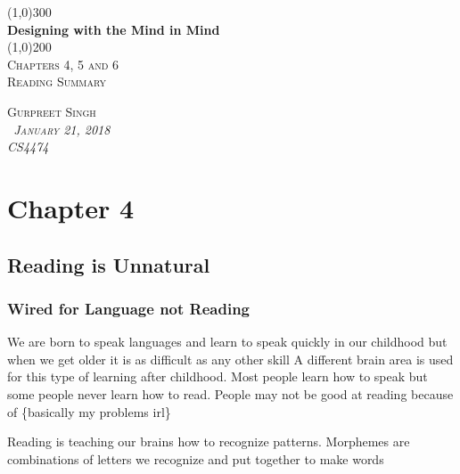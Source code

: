 \documentclass[11pt,]{article}
\begin{document}
\begin{titlepage}
    \begin{center}
    \line(1,0){300} \\ 
    [0.25in]
    \huge{\bfseries Designing with the Mind in Mind} \\
    [2mm]
    \line(1,0){200} \\
    [1.5cm] 
    \textsc{\Large Chapters 4, 5 and 6} \\
    [0.75cm]
    \textsc{\Large Reading Summary} \\
    [12cm]
    \end{center}
    
    \begin{flushright}
    \textsc{\Large{Gurpreet Singh \\}\normalsize\emph{\ January 21, 2018 \\}\normalsize\emph{CS4474 \\} }
    
    \end{flushright}

\end{titlepage}

\newpage
\shipout\null

\hypertarget{chapter-4}{%
\section{Chapter 4}\label{chapter-4}}

\hypertarget{reading-is-unnatural}{%
\subsection{Reading is Unnatural}\label{reading-is-unnatural}}

\hypertarget{wired-for-language-not-reading}{%
\subsubsection{Wired for Language not
Reading}\label{wired-for-language-not-reading}}

We are born to speak languages and learn to speak quickly in our
childhood but when we get older it is as difficult as any other skill A
different brain area is used for this type of learning after childhood.
Most people learn how to speak but some people never learn how to read.
People may not be good at reading because of \{basically my problems
irl\}

Reading is teaching our brains how to recognize patterns. Morphemes are
combinations of letters we recognize and put together to make words
\end{document}
